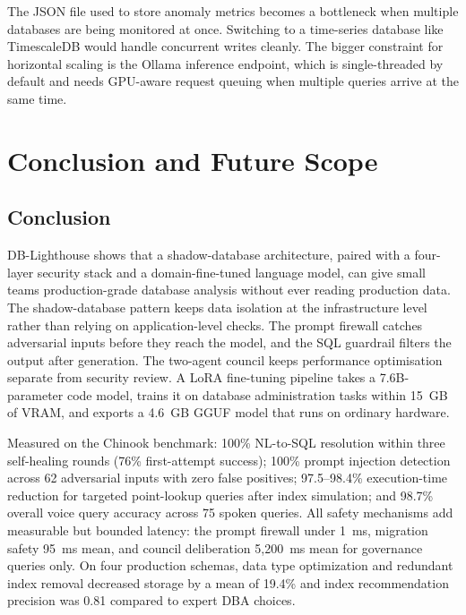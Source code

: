 \documentclass[12pt,a4paper]{report}
\begin{document}
The JSON file used to store anomaly metrics becomes a bottleneck when multiple databases are being monitored at once. Switching to a time-series database like TimescaleDB would handle concurrent writes cleanly. The bigger constraint for horizontal scaling is the Ollama inference endpoint, which is single-threaded by default and needs GPU-aware request queuing when multiple queries arrive at the same time.

\chapter{Conclusion and Future Scope}

\section{Conclusion}

DB-Lighthouse shows that a shadow-database architecture, paired with a four-layer security stack and a domain-fine-tuned language model, can give small teams production-grade database analysis without ever reading production data. The shadow-database pattern keeps data isolation at the infrastructure level rather than relying on application-level checks. The prompt firewall catches adversarial inputs before they reach the model, and the SQL guardrail filters the output after generation. The two-agent council keeps performance optimisation separate from security review. A LoRA fine-tuning pipeline takes a 7.6B-parameter code model, trains it on database administration tasks within 15~GB of VRAM, and exports a 4.6~GB GGUF model that runs on ordinary hardware.

Measured on the Chinook benchmark: 100\% NL-to-SQL resolution within three self-healing rounds (76\% first-attempt success); 100\% prompt injection detection across 62 adversarial inputs with zero false positives; 97.5--98.4\% execution-time reduction for targeted point-lookup queries after index simulation; and 98.7\% overall voice query accuracy across 75 spoken queries. All safety mechanisms add measurable but bounded latency: the prompt firewall under 1~ms, migration safety 95~ms mean, and council deliberation 5,200~ms mean for governance queries only. On four production schemas, data type optimization and redundant index removal decreased storage by a mean of 19.4\% and index recommendation precision was 0.81 compared to expert DBA choices.
\end{document}
